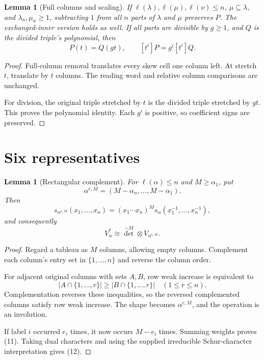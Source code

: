 \documentclass[11pt]{article}
\newtheorem{lemma}[theorem]{Lemma}
\begin{document}
\begin{lemma}[Full columns and scaling]\label{lem:basic}
If $\ell(\lambda),\ell(\mu),\ell(\nu)\le n$,
$\mu\subseteq\lambda$, and $\lambda_n,\mu_n\ge1$, subtracting $1$
from all $n$ parts of $\lambda$ and $\mu$ preserves $P$.
The exchanged-inner version holds as well. If all parts are divisible by \(g\ge1\), and \(Q\) is the divided triple's polynomial, then
\[
P(t)=Q(gt),\qquad [t^i]P=g^i[t^i]Q.
                                                               \tag{10}
\]
\end{lemma}

\begin{proof}
Full-column removal translates every skew cell one column left. At stretch \(t\), translate by \(t\) columns. The reading word and relative column comparisons are unchanged.

For division, the original triple stretched by \(t\) is the divided triple stretched by \(gt\). This proves the polynomial identity. Each \(g^i\) is positive, so coefficient signs are preserved.
\end{proof}

\section{Six representatives}

\begin{lemma}[Rectangular complement]\label{lem:complement}
For \(\ell(\alpha)\le n\) and \(M\ge\alpha_1\), put
\[
\alpha^{c,M}=(M-\alpha_n,\ldots,M-\alpha_1).
\]
Then
\[
s_{\alpha^{c,M}}(x_1,\ldots,x_n)
=(x_1\cdots x_n)^M s_\alpha(x_1^{-1},\ldots,x_n^{-1}),
                                                               \tag{11}
\]
and consequently
\[
V_\alpha^*\cong\det^{-M}\otimes V_{\alpha^{c,M}}.
                                                               \tag{12}
\]
\end{lemma}

\begin{proof}
Regard a tableau as \(M\) columns, allowing empty columns. Complement each column's entry set in \(\{1,\ldots,n\}\) and reverse the column order.

For adjacent original columns with sets \(A,B\), row weak increase is equivalent to
\[
|A\cap\{1,\ldots,r\}|\ge |B\cap\{1,\ldots,r\}|
\quad(1\le r\le n).
\]
Complementation reverses these inequalities, so the reversed complemented columns satisfy row weak increase. The shape becomes \(\alpha^{c,M}\), and the operation is an involution.

If label \(i\) occurred \(e_i\) times, it now occurs \(M-e_i\) times. Summing weights proves (11). Taking dual characters and using the supplied irreducible Schur-character interpretation gives (12).
\end{proof}
\end{document}
